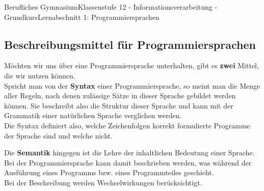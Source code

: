 \documentclass[11pt,oneside,openany,headings=optiontotoc,11pt,numbers=noenddot]{article}
\begin{document}
\begin{worksheet}{Berufliches Gymnasium}{Klassenstufe 12 - Informationsverarbeitung - Grundkurs}{Lernabschnitt 1: Programmiersprachen}
		\subsection{Beschreibungsmittel für Programmiersprachen}
		Möchten wir uns über eine Programmiersprache unterhalten, gibt es \textbf{zwei} Mittel, die wir nutzen können.\\
		Spricht man von der \textbf{Syntax} einer Programmiersprache, so meint man die Menge aller Regeln, nach denen zulässige Sätze in dieser Sprache gebildet werden können. Sie beschreibt also die Struktur dieser Sprache und kann mit der Grammatik einer natürlichen Sprache verglichen werden.\\
		Die Syntax definiert also, welche Zeichenfolgen korrekt formulierte Programme der Sprache sind und welche nicht.\\
		\par\noindent
		Die \textbf{Semantik} hingegen ist die Lehre der inhaltlichen Bedeutung einer Sprache. Bei der Programmiersprache kann damit beschrieben werden, was während der Ausführung eines Programms bzw. eines Programmteiles geschieht.\\
		Bei der Beschreibung werden Wechselwirkungen berücksichtigt.

\end{worksheet}
\end{document}
